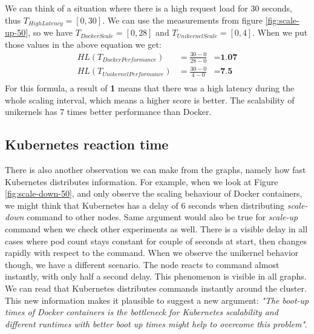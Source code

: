 We can think of a situation where there is a high request load for 30 seconds, thus \(T_{HighLatency}=[0,30]\). We can use the measurements from figure \ref{fig:scale-up-50}, so we have \(T_{DockerScale}=[0,28]\) and \(T_{UnikernelScale}=[0,4]\). When we put those values in the above equation we get:
\begin{equation*}
  \begin{aligned}
  HL(T_{DockerPerformance})&=\frac{30-0}{28-0}&=\textbf{1.07} \\
  HL(T_{UnikernelPerformance})&=\frac{30-0}{4-0}&=\textbf{7.5} \\
  \end{aligned}
\end{equation*}
For this formula, a result of \textbf{1} means that there was a high latency during the whole scaling interval, which means a higher score is better. The scalability of unikernels has 7 times better performance than Docker.

\fi
\subsection{Kubernetes reaction time}
There is also another observation we can make from the graphs, namely how fast Kubernetes distributes information. For example, when we look at Figure \ref{fig:scale-down-50}, and only observe the scaling behaviour of Docker containers, we might think that Kubernetes has a delay of 6 seconds when distributing \textit{scale-down} command to other nodes. Same argument would also be true for \textit{scale-up} command when we check other experiments as well. There is a visible delay in all cases where pod count stays constant for couple of seconds at start, then changes rapidly with respect to the command. When we observe the unikernel behavior though, we have a different scenario. The node reacts to command almost instantly, with only half a second delay. This phenomenon is visible in all graphs. We can read that Kubernetes distributes commands instantly around the cluster. This new information makes it plausible to suggest a new argument: \textit{"The boot-up times of Docker containers is the bottleneck for Kubernetes scalability and different runtimes with better boot up times might help to overcome this problem"}.


  
